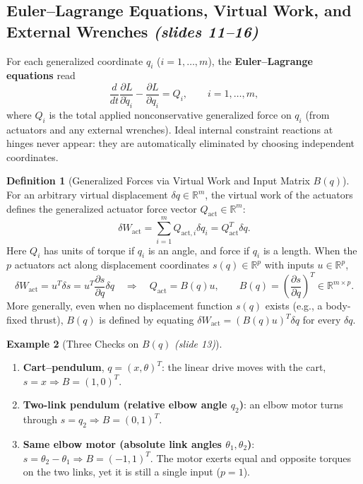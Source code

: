 \documentclass[11pt, a4paper]{article}
\theoremstyle{definition}
\newtheorem{definition}{Definition}[section]
\newtheorem{example}[definition]{Example}
\theoremstyle{plain}
\begin{document}
\subsection{Euler--Lagrange Equations, Virtual Work, and External Wrenches \emph{(slides 11--16)}}

For each generalized coordinate $q_i$ ($i = 1, \dots, m$), the \textbf{Euler--Lagrange equations} read
\begin{equation}
  \frac{d}{dt}\frac{\partial L}{\partial \dot{q}_i} - \frac{\partial L}{\partial q_i} = Q_i, \qquad i = 1, \dots, m,
  \label{eq:EL}
\end{equation}
where $Q_i$ is the total applied nonconservative generalized force on $q_i$ (from actuators and any external wrenches). Ideal internal constraint reactions at hinges never appear: they are automatically eliminated by choosing independent coordinates.

\begin{definition}[Generalized Forces via Virtual Work and Input Matrix $B(q)$]
For an arbitrary virtual displacement $\delta q \in \mathbb{R}^m$, the virtual work of the actuators defines the generalized actuator force vector $Q_{\text{act}} \in \mathbb{R}^m$:
\[
  \delta W_{\text{act}} = \sum_{i=1}^{m} Q_{\text{act}, i} \delta q_i = Q_{\text{act}}^T \delta q.
\]
Here $Q_i$ has units of torque if $q_i$ is an angle, and force if $q_i$ is a length. When the $p$ actuators act along displacement coordinates $s(q) \in \mathbb{R}^p$ with inputs $u \in \mathbb{R}^p$,
\[
  \delta W_{\text{act}} = u^T \delta s = u^T \frac{\partial s}{\partial q} \delta q
  \quad\Longrightarrow\quad
  Q_{\text{act}} = B(q) u, \qquad B(q) = \left(\frac{\partial s}{\partial q}\right)^T \in \mathbb{R}^{m \times p}.
\]
More generally, even when no displacement function $s(q)$ exists (e.g., a body-fixed thrust), $B(q)$ is defined by equating $\delta W_{\text{act}} = (B(q)u)^T \delta q$ for every $\delta q$.
\end{definition}

\begin{example}[Three Checks on $B(q)$ \emph{(slide 13)}]
\begin{enumerate}[label=\arabic*.]
  \item \textbf{Cart--pendulum}, $q = (x, \theta)^T$: the linear drive moves with the cart, $s = x \Rightarrow B = (1, 0)^T$.
  \item \textbf{Two-link pendulum (relative elbow angle $q_2$)}: an elbow motor turns through $s = q_2 \Rightarrow B = (0, 1)^T$.
  \item \textbf{Same elbow motor (absolute link angles $\theta_1, \theta_2$)}: $s = \theta_2 - \theta_1 \Rightarrow B = (-1, 1)^T$. The motor exerts equal and opposite torques on the two links, yet it is still a single input ($p = 1$).
\end{enumerate}
\end{example}
\end{document}
